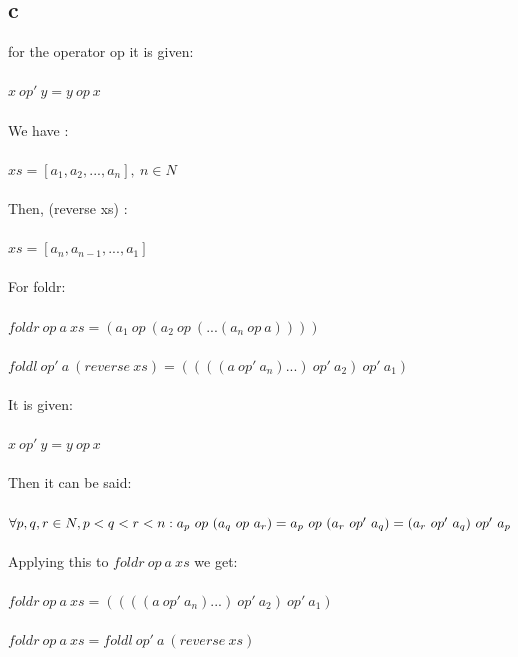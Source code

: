 \documentclass{article}
\begin{document}
    \subsection{\textbf{c}}
    for the operator op it is given:\\
    \\
    $x \  op' \  y = y \  op \  x$\\
    \\
    We have :\\
    \\
    $xs = [a_1, a_2, ..., a_n], \  n \in N$\\
    \\
    Then, (reverse xs) :\\
    \\
    $xs = [a_n, a_{n-1}, ..., a_1]$\\
    \\
    For foldr:\\
    \\
    $foldr \  op \  a \  xs = (a_1 \  op\ (a_2 \  op\  (... (a_n \  op \  a))))$\\
    \\
    $foldl \  op' \  a \  ( reverse \  xs) = ((((a \  op' \  a_n) ...)\  op' \  a_2) \  op' \  a_1)$\\
    \\
    It is given:\\
    \\
    $x \  op' \  y = y \  op \  x$\\
    \\
    Then it can be said:\\
    \\
    $\forall p, q, r \in N, p < q < r < n :\\ a_p \  op \  (a_q \  op \  a_r) = a_p \  op \  (a_r \  op' \  a_q) = (a_r \  op' \  a_q) \  op' \  a_p$\\
    \\
    Applying this to $foldr \  op \  a \  xs$ we get:\\
    \\
    $foldr \  op \  a \  xs = ((((a \  op' \  a_n) ...)\  op' \  a_2) \  op' \  a_1)$\\
    \\
    $foldr \  op \  a \  xs = foldl \  op' \  a \  ( reverse \  xs)$\\
    \\
\end{document}
